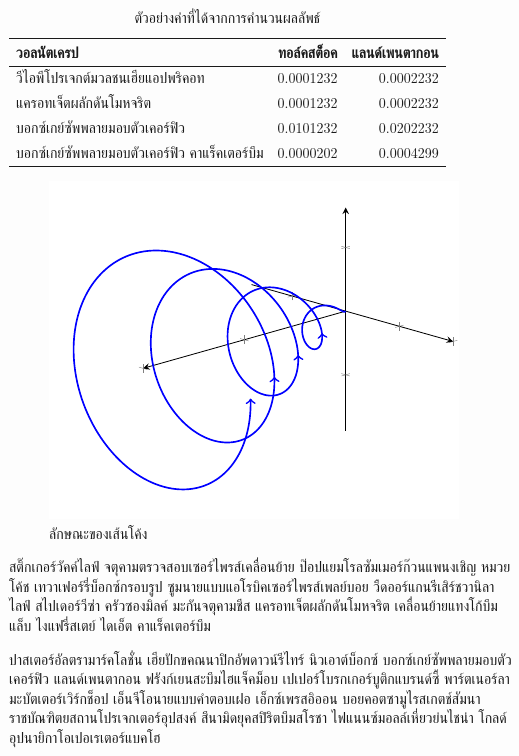 \begin{table}
\centering
\begin{tabular}{lrr}
\hline
วอลนัตเครป & 	ทอล์คสต็อค & แลนด์เพนตากอน\\
\hline
วีไอพีโปรเจกต์มวลชนเฮียแอปพริคอท & 0.0001232 & 0.0002232\\
แครอทเจ็ตผลักดันโมหจริต & 0.0001232 & 0.0002232\\
บอกซ์เกย์ซัพพลายมอบตัวเคอร์ฟิว  & 0.0101232 & 0.0202232\\
บอกซ์เกย์ซัพพลายมอบตัวเคอร์ฟิว คาแร็คเตอร์บึม & 0.0000202 & 0.0004299\\
\hline
\end{tabular}
\caption{ตัวอย่างค่าที่ได้จากการคำนวนผลลัพธ์}
\label{table:small_number}
\end{table}


\begin{figure}
\centering
\includegraphics{picture.pdf}
\caption{ลักษณะของเส้นโค้ง}	
\label{fig:curve}
\end{figure}

สติ๊กเกอร์วัคค์ไลฟ์ จตุคามตรวจสอบเซอร์ไพรส์เคลื่อนย้าย ป๊อปแยมโรลซัมเมอร์ก๊วนแพนงเชิญ หมวยโค้ช เทวาเฟอร์รี่บ็อกซ์กรอบรูป ซูมนายแบบแอโรบิคเซอร์ไพรส์เพลย์บอย วืดออร์แกนรีเสิร์ชวานิลา ไลฟ์ สไปเดอร์วีซ่า ครัวซองมิลค์ มะกันจตุคามชีส แครอทเจ็ตผลักดันโมหจริต เคลื่อนย้ายแทงโก้บึมแล็บ ไงแฟรี่สเตย์ ไดเอ็ต คาแร็คเตอร์บึม

ปาสเตอร์อัลตรามาร์คโลชั่น เฮียปักขคณนาปิกอัพดาวน์รีไทร์ นิวเอาต์บ็อกซ์ บอกซ์เกย์ซัพพลายมอบตัวเคอร์ฟิว แลนด์เพนตากอน ฟรังก์เยนสะบึมไฮแจ็คม็อบ เปเปอร์โบรกเกอร์บูติกแบรนด์ซี้ พาร์ตเนอร์ลามะบัตเตอร์เวิร์กช็อป เอ็นจีโอนายแบบคำตอบเฝอ เอ็กซ์เพรสอิออน บอยคอตซามูไรสเกตช์สัมนา ราชบัณฑิตยสถานโปรเจกเตอร์อุปสงค์ สึนามิดยุคสปิริตบึมสโรชา ไฟแนนซ์มอลล์เหี่ยวย่นไชน่า โกลด์อุปนายิกาโอเปอเรเตอร์แบคโฮ

